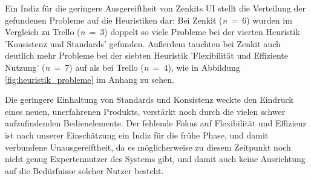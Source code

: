 Ein Indiz für die geringere Ausgereiftheit von Zenkits UI stellt die Verteilung der gefundenen Probleme auf die Heuristiken dar: Bei Zenkit (\textit{n}~=~6) wurden im Vergleich zu Trello (\textit{n}~=~3) doppelt so viele Probleme bei der vierten Heuristik 'Konsistenz und Standards'  gefunden.
Außerdem tauchten bei Zenkit auch deutlich mehr Probleme bei der siebten Heuristik 'Flexibilität und Effiziente Nutzung' (\textit{n}~=~7) auf als bei Trello (\textit{n}~=~4), wie in Abbildung \ref{fig:heuristik_probleme} im Anhang zu sehen. 

Die geringere Einhaltung von Standards und Konsistenz weckte den Eindruck eines neuen, unerfahrenen Produkts, verstärkt noch durch die vielen schwer aufzufindenden Bedienelemente. Der fehlende Fokus auf Flexibilität und Effizienz ist nach unserer Einschätzung ein Indiz für die frühe Phase, und damit verbundene Unausgereiftheit, da es möglicherweise zu diesem Zeitpunkt noch nicht genug Expertennutzer des Systems gibt, und damit auch keine Ausrichtung auf die Bedürfnisse solcher Nutzer besteht.
